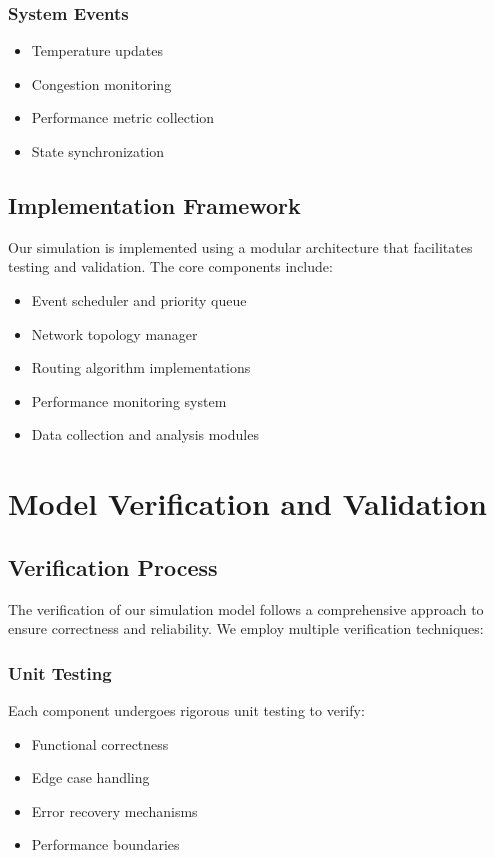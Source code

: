 \documentclass[12pt]{article}
\begin{document}
\subsubsection{System Events}
\begin{itemize}[noitemsep]
    \item Temperature updates
    \item Congestion monitoring
    \item Performance metric collection
    \item State synchronization
\end{itemize}

\subsection{Implementation Framework}
Our simulation is implemented using a modular architecture that facilitates testing and validation. The core components include:

\begin{itemize}[noitemsep]
    \item Event scheduler and priority queue
    \item Network topology manager
    \item Routing algorithm implementations
    \item Performance monitoring system
    \item Data collection and analysis modules
\end{itemize}

\section{Model Verification and Validation}
\subsection{Verification Process}
The verification of our simulation model follows a comprehensive approach to ensure correctness and reliability. We employ multiple verification techniques:

\subsubsection{Unit Testing}
Each component undergoes rigorous unit testing to verify:
\begin{itemize}[noitemsep]
    \item Functional correctness
    \item Edge case handling
    \item Error recovery mechanisms
    \item Performance boundaries
\end{itemize}
\end{document}

